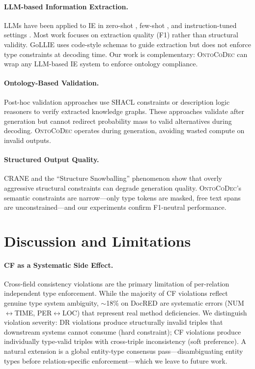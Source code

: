\documentclass[11pt,a4paper]{article}
\begin{document}
\paragraph{LLM-based Information Extraction.}
LLMs have been applied to IE in zero-shot \cite{wei2023zeroshot}, few-shot \cite{li2023codeie}, and instruction-tuned settings \cite{wang2023instructuie}.
Most work focuses on extraction quality (F1) rather than structural validity.
GoLLIE \cite{sainz2024gollie} uses code-style schemas to guide extraction but does not enforce type constraints at decoding time.
Our work is complementary: \textsc{OntoCoDec} can wrap any LLM-based IE system to enforce ontology compliance.

\paragraph{Ontology-Based Validation.}
Post-hoc validation approaches use SHACL constraints or description logic reasoners to verify extracted knowledge graphs.
These approaches validate after generation but cannot redirect probability mass to valid alternatives during decoding.
\textsc{OntoCoDec} operates during generation, avoiding wasted compute on invalid outputs.

\paragraph{Structured Output Quality.}
CRANE \cite{zheng2024openchat} and the ``Structure Snowballing'' phenomenon \cite{wu2024structure} show that overly aggressive structural constraints can degrade generation quality.
\textsc{OntoCoDec}'s semantic constraints are narrow---only type tokens are masked, free text spans are unconstrained---and our experiments confirm F1-neutral performance.

\section{Discussion and Limitations}
\label{sec:discussion}

\paragraph{CF as a Systematic Side Effect.}
Cross-field consistency violations are the primary limitation of per-relation independent type enforcement.
While the majority of CF violations reflect genuine type system ambiguity, $\sim$18\% on DocRED are systematic errors (NUM$\leftrightarrow$TIME, PER$\leftrightarrow$LOC) that represent real method deficiencies.
We distinguish violation severity: DR violations produce structurally invalid triples that downstream systems cannot consume (hard constraint); CF violations produce individually type-valid triples with cross-triple inconsistency (soft preference).
A natural extension is a global entity-type consensus pass---disambiguating entity types before relation-specific enforcement---which we leave to future work.
\end{document}
